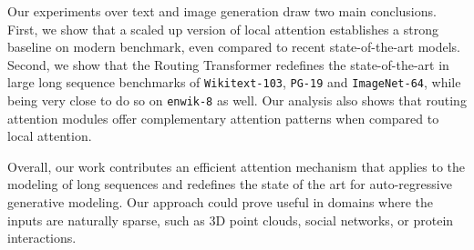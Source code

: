 Our experiments over text and image generation draw two main conclusions. First, we show that a scaled up version of local attention establishes a strong baseline on modern benchmark, even compared to recent state-of-the-art models. Second, we show that the Routing Transformer redefines the state-of-the-art in large long sequence benchmarks of
\texttt{Wikitext-103}, \texttt{PG-19} and \texttt{ImageNet-64}, while being very close to do so on 
\texttt{enwik-8} as well. Our analysis also shows that routing attention modules offer complementary attention patterns when compared to local attention.

Overall, our work contributes an efficient attention mechanism that applies to the modeling of long sequences and redefines the state of the art for auto-regressive generative modeling. Our approach could prove useful in domains where the inputs are naturally sparse, such as 3D point clouds, social networks, or protein interactions. 


